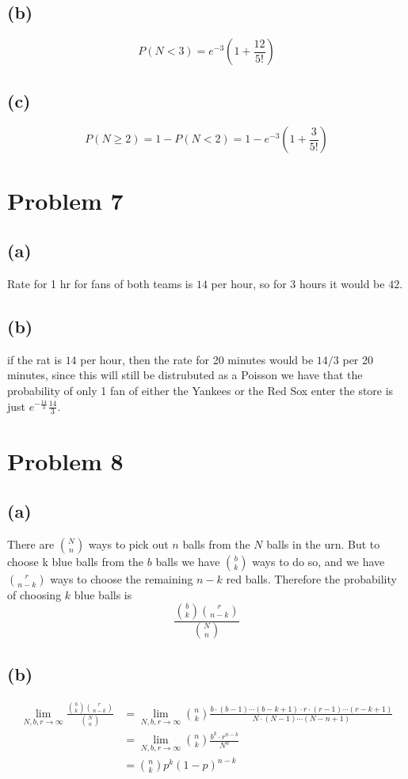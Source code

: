 \subsection*{(b)}
$$P(N<3)=e^{-3}\left(1+\frac{12}{5!}\right)$$
\subsection*{(c)}
$$P(N\geq 2)=1-P(N<2)=\boxed{1-e^{-3}\left(1+\frac{3}{5!}\right)}$$
\section*{Problem 7}
\subsection*{(a)}
Rate for 1 hr for fans of both teams is $14$ per hour,
so for 3 hours it would be $\boxed{42}$.
\subsection*{(b)}
if the rat is $14$ per hour, then the rate for 
20 minutes would be $14/3$ per 20 minutes, since this will
still be distrubuted as a Poisson we have that the probability 
of only 1 fan of either the Yankees or the Red Sox enter the store
is just $\boxed{e^{-\frac{14}{3}}\frac{14}{3}}$.
\section*{Problem 8}
\subsection*{(a)}
There are $N\choose n$ ways to pick out $n$ balls from the $N$
balls in the urn. But to choose k blue balls from the $b$ balls
we have $b\choose k$ ways to do so, and we have 
$r\choose n-k$ ways to choose the remaining $n-k$ red balls. Therefore the 
probability of choosing $k$ blue balls is
$$\boxed{\frac{{b\choose k}{r \choose n-k}}{{N\choose n}}}$$
\subsection*{(b)}
\begin{align*}
    \lim_{N,b,r\to \infty}\frac{{b\choose k}{r \choose n-k}}{{N\choose n}}&=
        \lim_{N,b,r\to \infty}{n\choose k}\frac{b\cdot(b-1)\cdots (b-k+1)\cdot r\cdot (r-1)\cdots (r-k+1)}{N\cdot (N-1)\cdots (N-n+1)}\\
        &=\lim_{N,b,r\to \infty}{n\choose k}\frac{b^k\cdot r^{n-k}}{N^n}\\
        &={n\choose k}p^k(1-p)^{n-k}
\end{align*}

